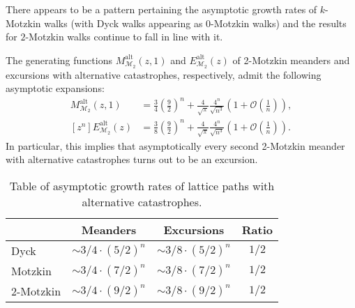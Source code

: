There appears to be a pattern pertaining the asymptotic growth rates of $k$-Motzkin walks (with Dyck walks appearing as $0$-Motzkin walks) and the results for $2$-Motzkin walks continue to fall in line with it.

\begin{corollary}
  The generating functions $M_{\mathcal{M}_2}^\mathrm{alt}(z,1)$ and $E_{\mathcal{M}_2}^\mathrm{alt}(z)$ of 2-Motzkin meanders and excursions with alternative catastrophes, respectively, admit the following asymptotic expansions: 
  \begin{align*}
    [z^{n}]M_{\mathcal{M}_2}^\mathrm{alt}(z,1) &= \frac{3}{4}\left(\frac{9}{2}\right)^{n} + \frac{4}{\sqrt{\pi}}\frac{4^n}{\sqrt{n^{3}}}\left(1 + \mathcal{O}\left(\frac{1}{n}\right)\right), \\
    [z^{n}]E_{\mathcal{M}_2}^\mathrm{alt}(z) &= \frac{3}{8}\left(\frac{9}{2}\right)^{n} + \frac{4}{\sqrt{\pi}}\frac{4^n}{\sqrt{n^{3}}}\left(1 + \mathcal{O}\left(\frac{1}{n}\right)\right).
  \end{align*}
  In particular, this implies that asymptotically every second 2-Motzkin meander with alternative catastrophes turns out to be an excursion.
\end{corollary}

\begin{table}[hbt!]
  \centering
  \begin{tabular}{|l|c|c|c|}
  \hline
  & \textbf{Meanders} & \textbf{Excursions} & \textbf{Ratio}\\ \hline
  Dyck & $ \sim 3/4 \cdot (5/2)^n $ & $ \sim 3/8 \cdot (5/2)^n $ & $1/2$ \\ \hline
  Motzkin & $ \sim 3/4 \cdot (7/2)^n $ & $ \sim 3/8 \cdot (7/2)^n $ & $1/2$ \\ \hline
  2-Motzkin & $ \sim 3/4 \cdot (9/2)^n $ & $ \sim 3/8 \cdot (9/2)^n $ & $1/2$ \\ \hline
  \end{tabular}
  \caption[Asymptotics of lattice paths with alternative catastrophes.]{Table of asymptotic growth rates of lattice paths with alternative catastrophes.}
  \label{tab:asym_alt_cat}
\end{table}

